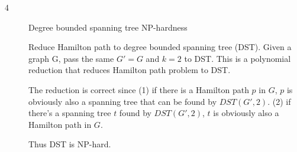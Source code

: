 \documentclass{article}
\begin{document}
\begin{description}
\item[4]{Degree bounded spanning tree NP-hardness}

  Reduce Hamilton path to degree bounded spanning tree (DST). Given a graph G, pass the same $G' = G$ and $k = 2$ to DST. This is a polynomial reduction that reduces Hamilton path problem to DST.

  The reduction is correct since (1) if there is a Hamilton path $p$ in $G$, $p$ is obviously also a spanning tree that can be found by $DST(G', 2)$. (2) if there's a spanning tree $t$ found by $DST(G', 2)$, $t$ is obviously also a Hamilton path in $G$.

  Thus DST is NP-hard.

\end{description}
\end{document}
